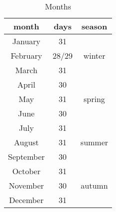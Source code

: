 \begin{table}[htbp]
\centering

\begin{tabular}{||c |c| c||} 
 \hline \hline
 \textbf{month} & \textbf{days} & \textbf{season} \\  \hline\hline

 January & 31 & \multirow{3}{*}{winter} \\

 February & 28/29 &  \\

 March & 31 &   \\ \hline

 April & 30 & \multirow{3}{*}{spring}\\ 
 
 May & 31 & \\ 

 June & 30 & \\ \hline

 July & 31 & \multirow{3}{*}{summer} \\

 August & 31 &  \\

 September & 30 & \\ \hline

 October & 31 & \multirow{3}{*}{autumn}\\

 November & 30 & \\

 December & 31 &\\ \hline \hline

 
\end{tabular}


\caption{Months}
\label{tab:tab_months}

\end{table}